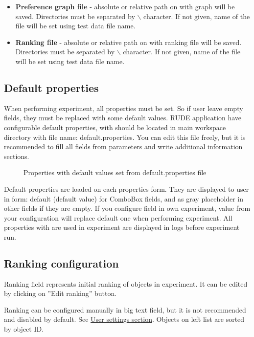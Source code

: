 \begin{itemize}
	\item \textbf{Preference graph file} - absolute or relative path on with graph will be saved. Directories must be separated by $\backslash$ character. If not given, name of the file will be set using test data file name.
	\item \textbf{Ranking file} - absolute or relative path on with ranking file will be saved. Directories must be separated by $\backslash$ character. If not given, name of the file will be set using test data file name.
\end{itemize}

\subsection{Default properties}\label{sub:properties-default}

When performing experiment, all properties must be set. So if user leave empty fields, they must be replaced with some default values. RUDE application have configurable default properties, with should be located in main workspace directory with file name: default.properties. You can edit this file freely, but it is recommended to fill all fields from parameters and write additional information sections.

\begin{figure*}[!ht] 
	\centering
	\caption{Properties with default values set from default.properties file}
\end{figure*}

Default properties are loaded on each properties form. They are displayed to user in form: default (default value) for ComboBox fields, and as gray placeholder in other fields if they are empty. If you configure field in own experiment, value from your configuration will replace default one when performing experiment. All properties with are used in experiment are displayed in logs before experiment run.


\subsection{Ranking configuration}\label{sub:properties-ranking}

Ranking field represents initial ranking of objects in experiment. It can be edited by clicking on ''Edit ranking'' button.

Ranking can be configured manually in big text field, but it is not recommended and disabled by default. See \hyperref[section:user-settings]{User settings section}. Objects on left list are sorted by object ID.


